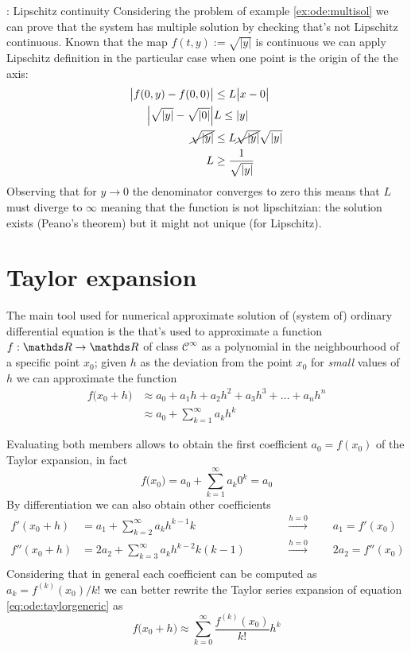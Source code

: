 	\begin{example}{: Lipschitz continuity}
		Considering the problem of example \ref{ex:ode:multisol} we can prove that the system has multiple solution by checking that's not Lipschitz continuous. Known that the map $f(t,y):= \sqrt{|y|}$ is continuous we can apply Lipschitz definition in the particular case when one point is the origin of the the axis:
		\begin{align*}
			\big| f(0,y) - f(0,0)\big| & \leq L\big|x-0\big| \\
			\left| \sqrt{|y|} - \sqrt{|0|} \right| & L  \leq |y| \\
			\cancel{\sqrt{|y|}} & \leq L \cancel{\sqrt{|y|}} \sqrt{|y|} \\
			L & \geq \frac 1{\sqrt{|y|}}
		\end{align*}
		Observing that for $y\rightarrow 0$ the denominator converges to zero this means that $L$ must diverge to $\infty$ meaning that the function is not lipschitzian: the solution exists (Peano's theorem) but it might not unique (for Lipschitz).
	\end{example}

\section{Taylor expansion}
	The main tool used for numerical approximate solution of (system of) ordinary differential equation is the  that's used to approximate a function $f:\R\rightarrow \R$ of class $\mathcal C^\infty$ as a polynomial in the neighbourhood of a specific point $x_0$; given $h$ as the deviation from the point $x_0$ for \textit{small} values of $h$ we can approximate the function
	\begin{equation} \label{eq:ode:taylorgeneric}
	\begin{split}
		f\big(x_0 + h\big) & \approx a_0 + a_1 h + a_2 h^2 + a_3 h^3 + \dots + a_n h^n \\
		& \approx a_0 + \sum_{k=1}^\infty a_k h^k
	\end{split} 
	\end{equation}
	
	Evaluating both members allows to obtain the first coefficient $a_0 =f(x_0)$ of the Taylor expansion, in fact
	\[ f\big(x_0\big) = a_0 + \sum_{k=1}^\infty a_k 0^k = a_0  \]
	By differentiation we can also obtain other coefficients
	\begin{align*}
		f'(x_0+h) & = a_1 + \sum_{k=2}^\infty a_k h^{k-1}k \qquad && \xrightarrow{h = 0} \qquad a_1 = f'(x_0) \\
		f''(x_0+h) & = 2a_2 + \sum_{k=3}^\infty a_k h^{k-2}k(k-1) \qquad && \xrightarrow{h = 0} \qquad 2a_2 = f''(x_0) \\
	\end{align*}
	Considering that in general each coefficient can be computed as $a_k = f^{(k)}(x_0) / k!$ we can better rewrite the Taylor series expansion of equation \ref{eq:ode:taylorgeneric} as
	\begin{equation}
		f\big(x_0 + h\big) \approx \sum_{k=0}^{\infty} \frac{f^{(k)}(x_0)}{k!} h^k
	\end{equation}
	
